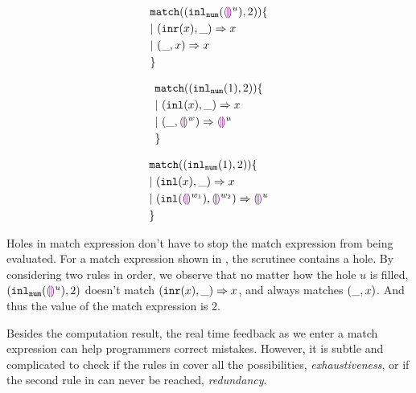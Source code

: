 \documentclass[acmsmall,screen,review,nonacm]{acmart}
\theoremstyle{slplain}
\numberwithin{thm}{section}
\begin{document}
\begin{figure}[h]
\begin{minipage}{0.33\textwidth}
\begin{equation}
\begin{split}
  &\mathtt{match} ((\mathtt{inl}_{\mathtt{num}}({\textcolor{violet}{\llparenthesis}\textcolor{violet}{\rrparenthesis}^{u}}) , 2)) \{\\
  &|~ (\mathtt{inr}(x) , \_) \Rightarrow x \\
  &|~ (\_ , x) \Rightarrow x \\
  &\}
\end{split}
\label{eq:complete}
\end{equation}
\end{minipage}%
\begin{minipage}{0.33\textwidth}
\begin{equation}
\begin{split}
  &\mathtt{match} ((\mathtt{inl}_{\mathtt{num}}({1}) , 2)) \{\\
  &|~ (\mathtt{inl}(x) , \_) \Rightarrow x \\
  &|~ (\_ , \textcolor{violet}{\llparenthesis}\textcolor{violet}{\rrparenthesis}^{w}) \Rightarrow \textcolor{violet}{\llparenthesis}\textcolor{violet}{\rrparenthesis}^{u} \\
  &\}
\end{split}
\label{eq:pathole-exhaustive}
\end{equation}
\end{minipage}%
\begin{minipage}{0.33\textwidth}
\begin{equation}
\begin{split}
  &\mathtt{match} ((\mathtt{inl}_{\mathtt{num}}({1}) , 2)) \{\\
  &|~ (\mathtt{inl}(x) , \_) \Rightarrow x \\
  &|~ (\mathtt{inl}(\textcolor{violet}{\llparenthesis}\textcolor{violet}{\rrparenthesis}^{w_1}) , \textcolor{violet}{\llparenthesis}\textcolor{violet}{\rrparenthesis}^{w_2}) \Rightarrow \textcolor{violet}{\llparenthesis}\textcolor{violet}{\rrparenthesis}^{u} \\
  &\}
\end{split}
\label{eq:pathole-redundant}
\end{equation}
\end{minipage}%
\end{figure}

Holes in match expression don't have to stop the match expression from being evaluated.
For a match expression shown in , the scrutinee contains a hole.
By considering two rules in order, we observe that
no matter how the hole $u$ is filled, $(\mathtt{inl}_{\mathtt{num}}({\textcolor{violet}{\llparenthesis}\textcolor{violet}{\rrparenthesis}^{u}}) , 2)$ doesn't match $(\mathtt{inr}(x) , \_) \Rightarrow x$,
and always matches $(\_ , x)$. And thus the value of the match expression is $2$.

Besides the computation result, the real time feedback as we enter a match expression can help programmers correct mistakes.
However, it is subtle and complicated to check if the rules in  cover all the possibilities, \ie \emph{exhaustiveness}, or if the second rule in  can never be reached, \ie \emph{redundancy}. 
\end{document}

